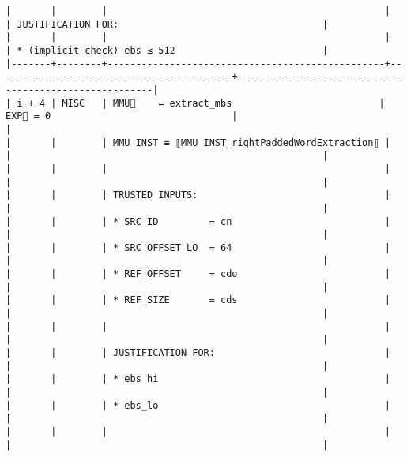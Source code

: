 \documentclass[varwidth=\maxdimen,margin=0.5cm,multi={verbatim}]{standalone}
\begin{document}
\begin{verbatim}
|       |        |                                                 |                                          | JUSTIFICATION FOR:                                    |
|       |        |                                                 |                                          | * (implicit check) ebs ≤ 512                          |
|-------+--------+-------------------------------------------------+------------------------------------------+-------------------------------------------------------|
| i + 4 | MISC   | MMU🏴    = extract_mbs                          | EXP🏴 = 0                                |                                                       |
|       |        | MMU_INST ≡ ⟦MMU_INST_rightPaddedWordExtraction⟧ |                                          |                                                       |
|       |        |                                                 |                                          |                                                       |
|       |        | TRUSTED INPUTS:                                 |                                          |                                                       |
|       |        | * SRC_ID         = cn                           |                                          |                                                       |
|       |        | * SRC_OFFSET_LO  = 64                           |                                          |                                                       |
|       |        | * REF_OFFSET     = cdo                          |                                          |                                                       |
|       |        | * REF_SIZE       = cds                          |                                          |                                                       |
|       |        |                                                 |                                          |                                                       |
|       |        | JUSTIFICATION FOR:                              |                                          |                                                       |
|       |        | * ebs_hi                                        |                                          |                                                       |
|       |        | * ebs_lo                                        |                                          |                                                       |
|       |        |                                                 |                                          |                                                       |

\end{verbatim}
\end{document}
